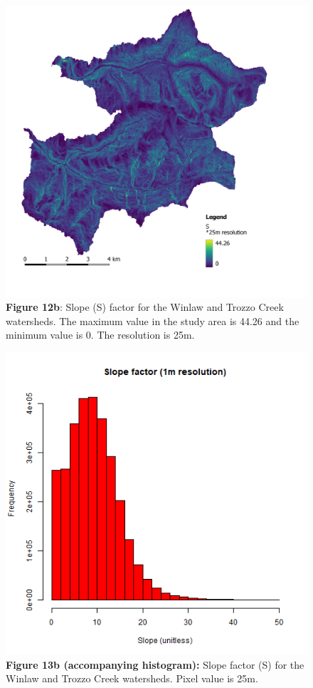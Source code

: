 \documentclass[
]{article}
\begin{document}
\begin{figure}
\centering
\includegraphics{img/S_25m.png}
\caption{\textbf{Figure 12b}: Slope (S) factor for the Winlaw and Trozzo Creek watersheds. The maximum value in the study area is 44.26 and the minimum value is 0. The resolution is 25m.}
\end{figure}

\begin{figure}
\centering
\includegraphics{img/S_25m_hist.png}
\caption{\textbf{Figure 13b (accompanying histogram):} Slope factor (S) for the Winlaw and Trozzo Creek watersheds. Pixel value is 25m.}
\end{figure}
\end{document}
